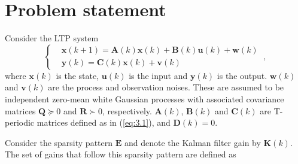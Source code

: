 \section{Problem statement} \label{sparse_kalman}

Consider the LTP system 
\begin{equation} \label{eq:3.5}
\begin{cases}
      &\boldsymbol{x}(k+1)=\boldsymbol{A}(k)\boldsymbol{x}(k)+\boldsymbol{B}(k)\boldsymbol{u}(k)+\boldsymbol{w}(k)\\
      &\boldsymbol{y}(k)=\boldsymbol{C}(k)\boldsymbol{x}(k)+\boldsymbol{v}(k)
\end{cases} \ ,
\end{equation}
where $\boldsymbol{x}(k)$ is the state, $\boldsymbol{u}(k)$ is the input and $\boldsymbol{y}(k)$ is the output. $\boldsymbol{w}(k)$ and $\boldsymbol{v}(k)$ are the process and observation noises. These are assumed to be independent zero-mean white Gaussian processes with associated covariance matrices $\boldsymbol{Q} \succeq 0$ and $\boldsymbol{R} \succ 0$, respectively. $\boldsymbol{A}(k)$, $\boldsymbol{B}(k)$ and $\boldsymbol{C}(k)$ are T-periodic matrices defined as in (\ref{eq:3.1}), and $\boldsymbol{D}(k)=0$.

Consider the sparsity pattern $\boldsymbol{E}$ and denote the Kalman filter gain by $\boldsymbol{K}(k)$. The set of gains that follow this sparsity pattern are defined as

